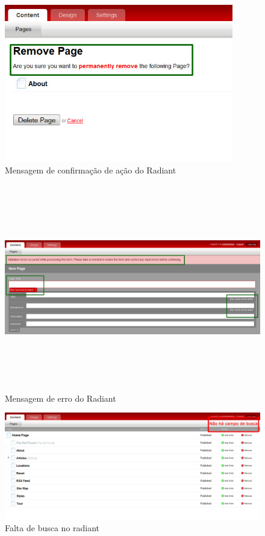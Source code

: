 \begin{figure}[here]
\includegraphics[width=100mm]{images/radiant_ponto_mensagem.jpg}
\caption{Mensagem de confirmação de ação do Radiant }
\label{fig:confirmacao_radiant}
\end{figure}

\begin{figure}[here]
\includegraphics[width=170mm,height=90mm]{images/radiant_ponto_msg_erro.jpg}
\caption{Mensagem de erro do Radiant }
\label{fig:erro_radiant}
\end{figure}


\begin{figure}[here]
\includegraphics[width=150mm]{images/radiant_erro_busca.jpg}
\caption{Falta de busca no radiant}
\label{fig:falta_busca_radiant}
\end{figure}

